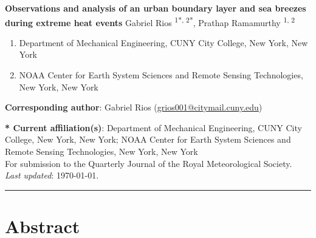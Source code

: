 \documentclass[11pt,a4paper]{article}
\begin{document}

\textbf{Observations and analysis of an urban boundary layer and sea breezes during extreme heat events}
Gabriel Rios \textsuperscript{1*, 2*}, Prathap Ramamurthy \textsuperscript{1, 2}

\small{
\begin{enumerate}[leftmargin=0.5cm, itemsep=0mm]
	\item Department of Mechanical Engineering, CUNY City College, New York, New York
	\item NOAA Center for Earth System Sciences and Remote Sensing Technologies, New York, New York
\end{enumerate}
}

\textbf{Corresponding author}: Gabriel Rios (\href{mailto:grios001@citymail.cuny.edu}{grios001@citymail.cuny.edu})

\textbf{* Current affiliation(s)}: Department of Mechanical Engineering, CUNY City College, New York, New York; NOAA Center for Earth System Sciences and Remote Sensing Technologies, New York, New York \\

\small{For submission to the Quarterly Journal of the Royal Meteorological Society.} \\
\small{\textit{Last updated}: \today.}

\noindent\rule{\textwidth}{1pt}

\linenumbers


\section*{Abstract}
\end{document}

